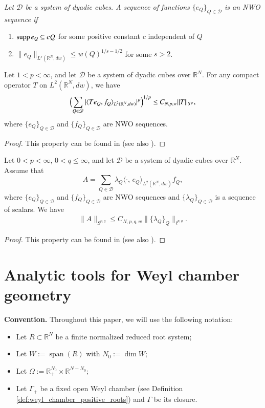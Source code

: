 \documentclass[12pt]{amsart}
\begin{document}
{\it Let $\mathscr{D}$ be a system of dyadic cubes. A sequence of functions $\{e_Q\}_{Q\in\mathscr{D}}$ is an NWO sequence if
\begin{enumerate}
  \item ${\rm supp}{\hspace{.05cm}} e_Q\subseteq cQ$ for some positive constant $c$ independent of $Q$
  \item $\|e_Q\|_{L^s(\mathbb{R}^{N},dw)}\leq w(Q)^{1/s-1/2}$ for some $s>2$.
\end{enumerate}
}
\begin{lemma}\label{NWOLEMMAA}
Let $1<p<\infty$, and let $\mathscr{D}$ be a
system of dyadic cubes over $\mathbb{R}^N$. For any compact operator $ T $ on $ L ^2 (\mathbb R ^{N},dw)$, we have
\begin{equation*}
\Bigl(
\sum_{Q\in \mathscr{D}} |\langle T e_Q, f_Q \rangle_{L^2(\mathbb{R}^N,dw)} | ^{p}
\Bigr) ^{1/p} \leq C_{N,p,w} \| T \| _{S ^{p}},
\end{equation*}
where $\{e_Q\}_{Q\in\mathscr{D}}$ and $\{f_Q\}_{Q\in\mathscr{D}}$ are NWO sequences.
\end{lemma}
\begin{proof}
This property can be found in  \cite[(1.10)]{RS} (see also \cite[Section 7]{HKarxiv}).
\end{proof}

\begin{lemma}\label{NWOLEMMAA2}
Let $0<p<\infty$, $0<q\leq \infty$, and let $\mathscr{D}$ be a
system of dyadic cubes over $\mathbb{R}^N$. Assume that
$$A=\sum_{Q\in\mathscr{D}}\lambda_Q\langle \cdot,\,e_Q\rangle_{L^2(\mathbb{R}^N,dw)} f_Q,$$
where $\{e_Q\}_{Q\in\mathscr{D}}$ and $\{f_Q\}_{Q\in\mathscr{D}}$ are NWO sequences and $\{\lambda_Q\}_{Q\in\mathscr{D}}$ is a sequence of scalars. We have
\begin{align}\label{nwose}
\|A\|_{S^{p,q}}\leq C_{N,p,q,w} \|\{\lambda_Q\}_Q\|_{\ell^{p,q}}.
\end{align}
\end{lemma}
\begin{proof}
This property can be found in  \cite[(1.9)]{RS} (see also \cite[Section 7]{HKarxiv}).
\end{proof}

\section{Analytic tools for Weyl chamber geometry}
\setcounter{equation}{0}

{\bf Convention. }
Throughout this paper, we will use the following notation:
\begin{itemize}
  \item Let $R
  \subset \mathbb{R}^{N}$ be a finite normalized reduced root system;
  \item Let
$W:=\operatorname{span}(R)$ with $N_{0}:=\dim W$;
\item Let
$
  \Omega:=\mathbb{R}_+^{N_{0}}\times \mathbb{R}^{N-N_{0}};
$
\item Let $\Gamma_+$ be a fixed open Weyl chamber (see Definition \ref{def:weyl_chamber_positive_roots}) and $\Gamma$ be its closure.
\end{itemize}
\end{document}
